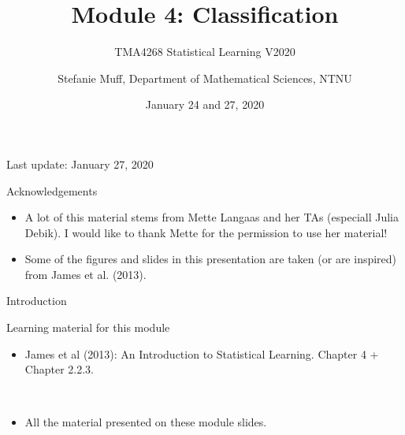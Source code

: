 \documentclass[10pt,ignorenonframetext,]{beamer}
\title{Module 4: Classification}
\subtitle{TMA4268 Statistical Learning V2020}
\author{Stefanie Muff, Department of Mathematical Sciences, NTNU}
\date{January 24 and 27, 2020}
\providecommand{\tightlist}{%
  \setlength{\itemsep}{0pt}\setlength{\parskip}{0pt}}
\begin{document}
\frame{\titlepage}

\begin{frame}

Last update: January 27, 2020

\end{frame}

\begin{frame}{Acknowledgements}

\begin{itemize}
\item
  A lot of this material stems from Mette Langaas and her TAs (especiall
  Julia Debik). I would like to thank Mette for the permission to use
  her material!
\item
  Some of the figures and slides in this presentation are taken (or are
  inspired) from James et al. (2013).
\end{itemize}

\end{frame}

\begin{frame}{Introduction}

\begin{block}{Learning material for this module}

\vspace{2mm}

\begin{itemize}
\tightlist
\item
  James et al (2013): An Introduction to Statistical Learning. Chapter 4
  + Chapter 2.2.3.
\end{itemize}

\(~\)

\begin{itemize}
\tightlist
\item
  All the material presented on these module slides.
\end{itemize}

\end{block}

\end{frame}
\end{document}
